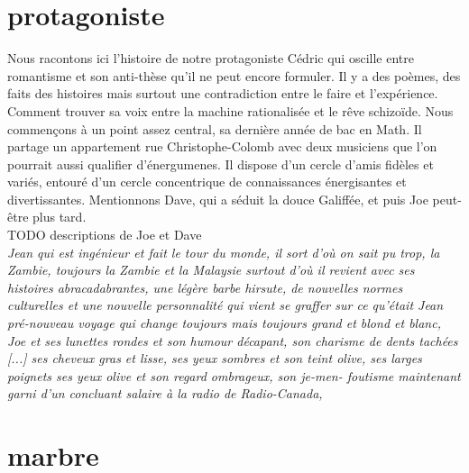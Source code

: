 \documentclass{article}
\begin{document}
\section{protagoniste}
Nous racontons ici l'histoire de notre protagoniste Cédric qui oscille entre
romantisme et son anti-thèse qu'il ne peut encore formuler. Il y a des poèmes,
des faits des histoires mais surtout une contradiction entre le faire et
l'expérience. Comment trouver sa voix entre la machine rationalisée et le rêve
schizoïde. Nous commençons à un point assez central, sa dernière année de bac en
Math. Il partage un appartement rue Christophe-Colomb avec deux musiciens que
l'on pourrait aussi qualifier d'énergumenes. Il dispose d'un cercle d'amis
fidèles et variés, entouré d'un cercle concentrique de connaissances
énergisantes et divertissantes. Mentionnons Dave, qui a séduit la douce
Galiffée, et puis Joe peut-être plus tard.\\

TODO descriptions de Joe et Dave\\

\textit{Jean qui est ingénieur et fait le tour du monde, il sort d’où on sait pu
  trop, la Zambie, toujours la Zambie et la Malaysie surtout d’où il revient
  avec ses histoires abracadabrantes, une légère barbe hirsute, de nouvelles
  normes culturelles et une nouvelle personnalité qui vient se graffer sur ce
  qu’était Jean pré-nouveau voyage qui change toujours mais toujours grand et
  blond et blanc,}\\

\textit{Joe et ses lunettes rondes et son humour décapant, son charisme de dents
  tachées [...] ses cheveux gras et lisse, ses yeux sombres et son teint olive,
  ses larges poignets ses yeux olive et son regard ombrageux, son je-men-
  foutisme maintenant garni d’un concluant salaire à la radio de Radio-Canada,}\\

\clearpage


\section{marbre}
\end{document}
